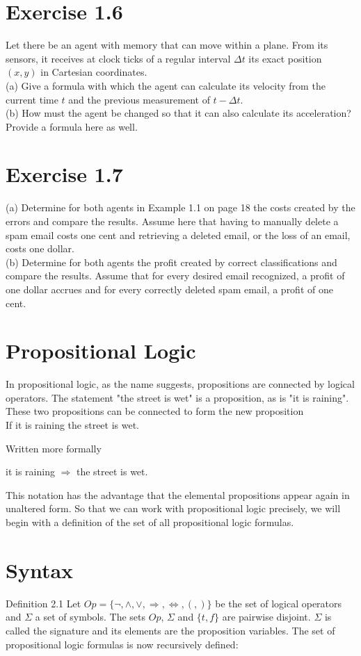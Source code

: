 \documentclass[10pt]{book}
\begin{document}
\section{Exercise 1.6}
Let there be an agent with memory that can move within a plane. From its sensors, it receives at clock ticks of a regular interval $\Delta t$ its exact position $(x, y)$ in Cartesian coordinates.\\
(a) Give a formula with which the agent can calculate its velocity from the current time $t$ and the previous measurement of $t-\Delta t$.\\
(b) How must the agent be changed so that it can also calculate its acceleration? Provide a formula here as well.

\section{Exercise 1.7}
(a) Determine for both agents in Example 1.1 on page 18 the costs created by the errors and compare the results. Assume here that having to manually delete a spam email costs one cent and retrieving a deleted email, or the loss of an email, costs one dollar.\\
(b) Determine for both agents the profit created by correct classifications and compare the results. Assume that for every desired email recognized, a profit of one dollar accrues and for every correctly deleted spam email, a profit of one cent.

\section{Propositional Logic}
In propositional logic, as the name suggests, propositions are connected by logical operators. The statement "the street is wet" is a proposition, as is "it is raining". These two propositions can be connected to form the new proposition\\
If it is raining the street is wet.

Written more formally

it is raining $\Rightarrow$ the street is wet.

This notation has the advantage that the elemental propositions appear again in unaltered form. So that we can work with propositional logic precisely, we will begin with a definition of the set of all propositional logic formulas.

\section{Syntax}
Definition 2.1 Let $Op=\{\neg,\wedge,\vee,\Rightarrow,\Leftrightarrow,(,)\}$ be the set of logical operators and $\Sigma$ a set of symbols. The sets $Op$, $\Sigma$ and $\{t,f\}$ are pairwise disjoint. $\Sigma$ is called the signature and its elements are the proposition variables. The set of propositional logic formulas is now recursively defined:
\end{document}
